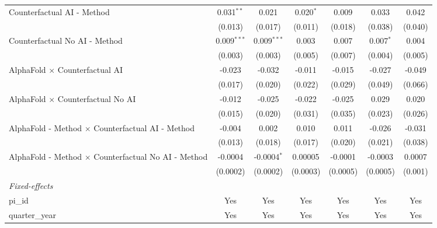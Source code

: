 \begin{tabular}{lcccccc}
   Counterfactual AI - Method                                 & 0.031$^{**}$  & 0.021         & 0.020$^{*}$  & 0.009       & 0.033       & 0.042\\   
                                                              & (0.013)       & (0.017)       & (0.011)      & (0.018)     & (0.038)     & (0.040)\\   
   Counterfactual No AI - Method                              & 0.009$^{***}$ & 0.009$^{***}$ & 0.003        & 0.007       & 0.007$^{*}$ & 0.004\\   
                                                              & (0.003)       & (0.003)       & (0.005)      & (0.007)     & (0.004)     & (0.005)\\   
   AlphaFold $\times$ Counterfactual AI                       & -0.023        & -0.032        & -0.011       & -0.015      & -0.027      & -0.049\\   
                                                              & (0.017)       & (0.020)       & (0.022)      & (0.029)     & (0.049)     & (0.066)\\   
   AlphaFold $\times$ Counterfactual No AI                    & -0.012        & -0.025        & -0.022       & -0.025      & 0.029       & 0.020\\   
                                                              & (0.015)       & (0.020)       & (0.031)      & (0.035)     & (0.023)     & (0.026)\\   
   AlphaFold - Method $\times$ Counterfactual AI - Method     & -0.004        & 0.002         & 0.010        & 0.011       & -0.026      & -0.031\\   
                                                              & (0.013)       & (0.018)       & (0.017)      & (0.020)     & (0.021)     & (0.038)\\   
   AlphaFold - Method $\times$ Counterfactual No AI - Method  & -0.0004       & -0.0004$^{*}$ & 0.00005      & -0.0001     & -0.0003     & 0.0007\\   
                                                              & (0.0002)      & (0.0002)      & (0.0003)     & (0.0005)    & (0.0005)    & (0.001)\\   
   \midrule
   \emph{Fixed-effects}\\
   pi\_id                                                     & Yes           & Yes           & Yes          & Yes         & Yes         & Yes\\  
   quarter\_year                                              & Yes           & Yes           & Yes          & Yes         & Yes         & Yes\\  

\end{tabular}

